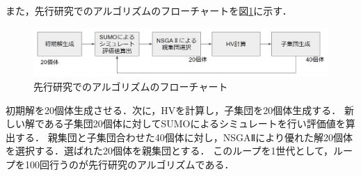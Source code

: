\documentclass[main]{subfiles}
\begin{document}
    また，先行研究でのアルゴリズムのフローチャートを図\ref{old_algo}に示す．
    \begin{figure}
        \centering
        \includegraphics[width=\linewidth]{figures/old_algo.png}
        \caption{先行研究でのアルゴリズムのフローチャート}
        \label{old_algo}
    \end{figure}
    初期解を20個体生成させる．次に，HVを計算し，子集団を20個体生成する．
    新しい解である子集団20個体に対してSUMOによるシミュレートを行い評価値を算出する．
    親集団と子集団合わせた40個体に対し，NSGAⅡにより優れた解20個体を選択する．選ばれた20個体を親集団とする．
    このループを1世代として，ループを100回行うのが先行研究のアルゴリズムである．
\end{document}

